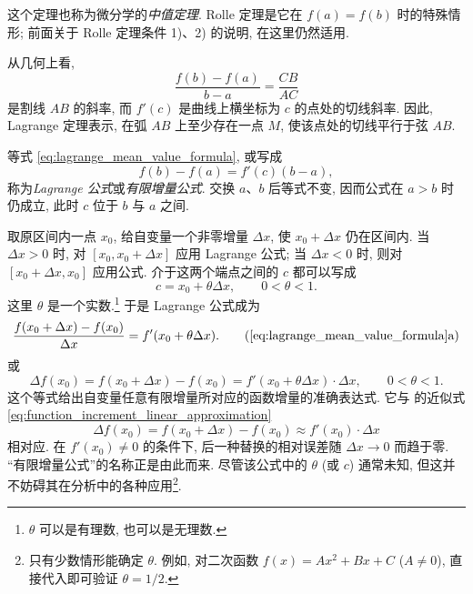 这个定理也称为微分学的\emph{中值定理}.
Rolle 定理是它在 $f(a)=f(b)$ 时的特殊情形;
前面关于 Rolle 定理条件 1)、2) 的说明, 在这里仍然适用.

\begin{figure}
    \vspace{-0.2cm}
\centering
{}
\end{figure}
\noindent 从几何上看,
$$
\frac{f(b)-f(a)}{b-a}=\frac{CB}{AC}
$$
是割线 $AB$ 的斜率, 而 $f'(c)$ 是曲线上横坐标为 $c$ 的点处的切线斜率.
因此, Lagrange 定理表示, 在弧 $AB$ 上至少存在一点 $M$,
使该点处的切线平行于弦 $AB$.

等式 \eqref{eq:lagrange_mean_value_formula}, 或写成
$$
f(b)-f(a)=f'(c)(b-a),
$$
称为\emph{Lagrange 公式}或\emph{有限增量公式}.
交换 $a$、$b$ 后等式不变, 因而公式在 $a>b$ 时仍成立, 此时 $c$ 位于 $b$ 与 $a$ 之间.

取原区间内一点 $x_0$, 给自变量一个非零增量 $\Delta x$,
使 $x_0+\Delta x$ 仍在区间内.
当 $\Delta x>0$ 时, 对 $[x_0,x_0+\Delta x]$ 应用 Lagrange 公式;
当 $\Delta x<0$ 时, 则对 $[x_0+\Delta x,x_0]$ 应用公式.
介于这两个端点之间的 $c$ 都可以写成
$$
c=x_0+\theta\Delta x,\qquad0<\theta<1.
$$
这里 $\theta$ 是一个实数.\footnote{$\theta$ 可以是有理数, 也可以是无理数.}
于是 Lagrange 公式成为
\begin{equation*}\label{Lagrange'}
\frac{f(x_0+\Delta x)-f(x_0)}{\Delta x}
=f'(x_0+\theta\Delta x).
\tag{\ref{eq:lagrange_mean_value_formula}a}
\end{equation*}
或
\begin{equation}\label{Lagrange''}
\Delta f(x_0)=f(x_0+\Delta x)-f(x_0)
=f'(x_0+\theta\Delta x)\cdot\Delta x,\qquad0<\theta<1.
\end{equation}
这个等式给出自变量任意有限增量所对应的函数增量的准确表达式.
它与  的近似式 \eqref{eq:function_increment_linear_approximation}
$$
\Delta f(x_0)=f(x_0+\Delta x)-f(x_0)\approx f'(x_0)\cdot\Delta x
$$
相对应.
在 $f'(x_0)\neq0$ 的条件下, 后一种替换的相对误差随 $\Delta x\to0$ 而趋于零.
“有限增量公式”的名称正是由此而来.
尽管该公式中的 $\theta$ (或 $c$) 通常未知, 
但这并不妨碍其在分析中的各种应用\footnote{只有少数情形能确定 $\theta$.
例如, 对二次函数 $f(x)=Ax^2+Bx+C$ ($A\neq0$), 直接代入即可验证 $\theta=1/2$.}.

